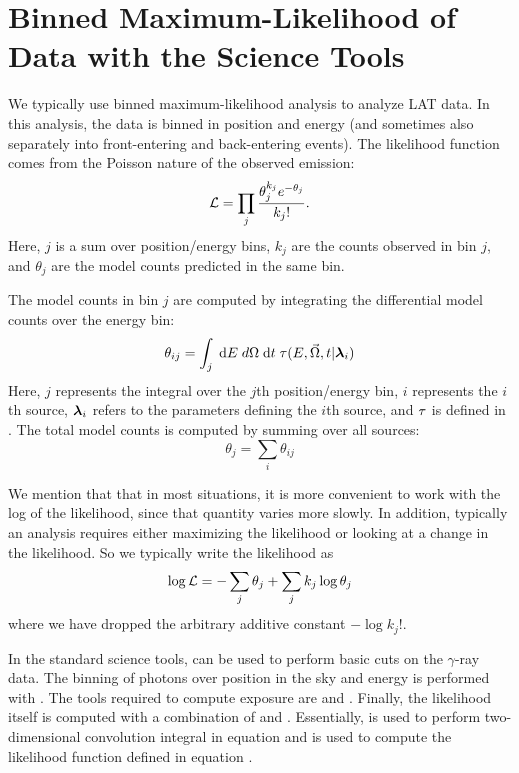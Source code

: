 \section{Binned Maximum-Likelihood of  Data with the Science Tools}

We typically use binned maximum-likelihood analysis to analyze \ac{LAT}
data.  In this analysis, the data is binned in position and energy (and
sometimes also separately into front-entering and back-entering events).
The likelihood function comes from the Poisson nature of the observed
emission:
\begin{equation}\eqnlabel{poisson_likelihood_counts_model}
  \likelihood=\prod_j \frac{\theta_j^{k_j} e^{-\theta_j}}{k_j!}.
\end{equation}
Here, $j$ is a sum over position/energy bins, $k_j$ are the counts
observed in bin $j$, and $\theta_j$ are the model counts predicted in
the same bin.

The model counts in bin $j$ are computed by integrating the differential
model counts over the energy bin:
\begin{equation}
  \theta_{ij} = \int_j \; \text{d}E \; 
  d\Omega \; \text{d}t \; 
  \tau(E,\vec\Omega,t|\boldsymbol{\lambda}_i)
\end{equation}
Here, $j$ represents the integral over the $j$th position/energy
bin, $i$ represents the $i$th source, $\boldsymbol{\lambda}_i$ refers to the
parameters defining the $i$th source, and $\tau$ is defined in
. The total model counts is computed by summing over
all sources:
\begin{equation}
  \theta_j = \sum_i \theta_{ij}
\end{equation}

We mention that that in most situations, it is more convenient to work
with the log of the likelihood, since that quantity varies more slowly.
In addition, typically an analysis requires either maximizing the
likelihood or looking at a change in the likelihood. So we typically
write the likelihood as
\begin{equation}\eqnlabel{log_likelihood_sum_theta}
  \log\likelihood = -\sum_j\theta_j + \sum_j k_j\log\theta_j 
\end{equation}
where we have dropped the arbitrary additive constant $-\log k_j!$.

In the standard \fermi science tools, \gtbin can be used to perform
basic cuts on the $\gamma$-ray data.  The binning of photons over
position in the sky and energy is performed with \gtbin.  The tools
required to compute exposure are \gtltcube and \gtexpcubetwo. Finally,
the likelihood itself is computed with a combination of \gtsrcmaps and
\gtlike.  Essentially, \gtsrcmaps is used to perform two-dimensional
convolution integral in equation  and
\gtlike is used to compute the likelihood function defined in equation
.


